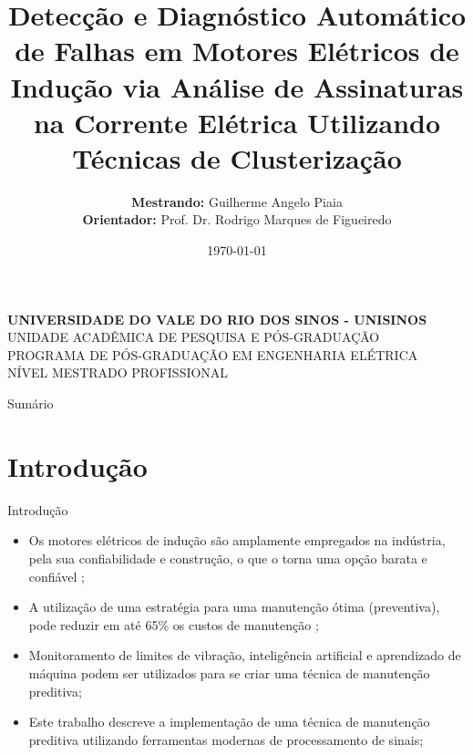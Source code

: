 \documentclass[aspectratio=169]{beamer}
\title[ Detecção e Diagnóstico Automático de Falhas em Motores Elétricos de Indução via Análise de Assinaturas na
Corrente Elétrica Utilizando ...]
{Detecção e Diagnóstico Automático de Falhas em Motores Elétricos de Indução via Análise de Assinaturas na
Corrente Elétrica Utilizando Técnicas de Clusterização}
\author[Piaia, G. A.]{
	{\fontsize{10}{8}\selectfont \textbf{Mestrando:} Guilherme Angelo Piaia} \\
	{\fontsize{10}{8}\selectfont \textbf{Orientador:} Prof. Dr. Rodrigo Marques de Figueiredo}
}
\date{\today}
\begin{document}

\begin{frame}
	\begin{minipage}{1\linewidth}
		\centering
		    \textbf{UNIVERSIDADE DO VALE DO RIO DOS SINOS - UNISINOS} \\ UNIDADE ACADÊMICA DE PESQUISA E PÓS-GRADUAÇÃO \\ PROGRAMA DE PÓS-GRADUAÇÃO EM ENGENHARIA ELÉTRICA \\ NÍVEL MESTRADO PROFISSIONAL
	\end{minipage}
	\titlepage
\end{frame}


\begin{frame}{Sumário}
	\tableofcontents
\end{frame}


\section{Introdução}
\begin{frame}{Introdução}
	\begin{itemize}
		\justifying
		\item Os motores elétricos de indução são amplamente empregados na indústria, pela sua confiabilidade e construção, o que o torna uma opção 
		barata e confiável \cite{Umans2003};
		\item A utilização de uma estratégia para uma manutenção ótima (preventiva), pode reduzir em até 65\% os custos de manutenção \cite{Wu2013};
		\item Monitoramento de limites de vibração, inteligência artificial e aprendizado de máquina podem ser
		utilizados para se criar uma técnica de manutenção preditiva;
		\item Este trabalho descreve a implementação de uma técnica de manutenção preditiva utilizando ferramentas
		modernas de processamento de sinais;
	\end{itemize}
\end{frame}

\end{document}
